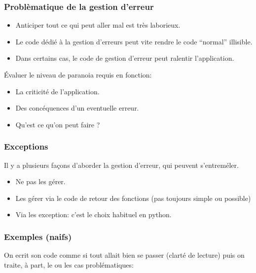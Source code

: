\documentclass{beamer}
\begin{document}
\begin{frame}\frametitle{Problèmatique de la gestion d'erreur}
  \begin{itemize}
  \item Anticiper tout ce qui peut aller mal est très laborieux.
  \item Le code dédié à la gestion d'erreurs peut vite rendre le code ``normal'' illisible.
  \item Dans certains cas, le code de gestion d'erreur peut ralentir l'application.
  \end{itemize}
  Évaluer le niveau de paranoia requis en fonction:
  \begin{itemize}
  \item La criticité de l'application.
  \item Des concéquences d'un eventuelle erreur.
  \item Qu'est ce qu'on peut faire ?
  \end{itemize}
\end{frame}

\begin{frame}\frametitle{Exceptions}
  Il y a plusieurs façons d'aborder la gestion d'erreur, qui peuvent s'entreméler.
  \begin{itemize}
  \item Ne pas les gérer.
  \item Les gérer via le code de retour des fonctions (pas toujours simple ou possible)
  \item Via les exception: c'est le choix habituel en python.
  \end{itemize}
\end{frame}

\begin{frame}[fragile]\frametitle{Exemples (naifs)}
  On ecrit son code comme si tout allait bien se passer (clarté de lecture) puis on traite, à part, le ou les cas problématiques:

    
\end{frame}
\end{document}
